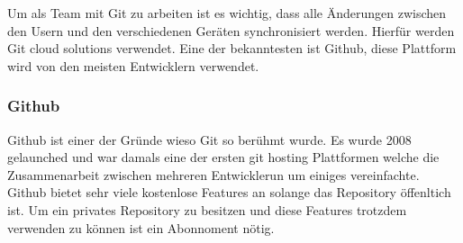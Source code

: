 Um als Team mit Git zu arbeiten ist es wichtig, dass alle Änderungen zwischen den Usern und den verschiedenen Geräten synchronisiert werden. Hierfür werden Git cloud solutions verwendet. Eine der bekanntesten ist Github, diese Plattform wird von den meisten Entwicklern verwendet.

\subsubsection{Github}

Github ist einer der Gründe wieso Git so berühmt wurde. Es wurde 2008 gelaunched und war damals eine der ersten git hosting Plattformen welche die Zusammenarbeit zwischen mehreren Entwicklerun um einiges vereinfachte. Github bietet sehr viele kostenlose Features an solange das Repository öffenltich ist. Um ein privates Repository zu besitzen und diese Features trotzdem verwenden zu können ist ein Abonnoment nötig.

\cite{Github_1}
\cite{Github_2}